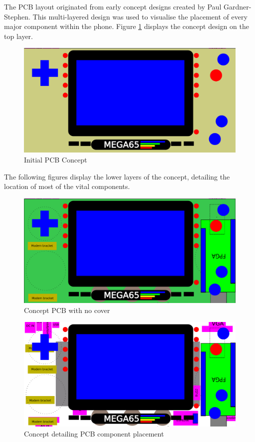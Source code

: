 The PCB layout originated from early concept designs created by Paul Gardner-Stephen. This multi-layered design was used to visualise the placement of every major component within the phone. Figure \ref{fig:Concept} displays the concept design on the top layer. 

\begin{figure}
	\includegraphics[width=\linewidth]{Figures/handset-layout-v1.pdf}
	\caption{Initial PCB Concept}
	\label{fig:Concept}
\end{figure}

	The following figures display the lower layers of the concept, detailing the location of most of the vital components. 

\begin{figure}
	\includegraphics[width=\linewidth]{Figures/handset-layout-v1-no-cover.pdf}
	\caption{Concept PCB with no cover}
	\label{fig:nocover}
\end{figure}

\begin{figure}
	\includegraphics[width=\linewidth]{Figures/handset-layout-v1-no-PCB-no-cover.pdf}
	\caption{Concept detailing PCB component placement }
	\label{fig:nopcb}
\end{figure}

